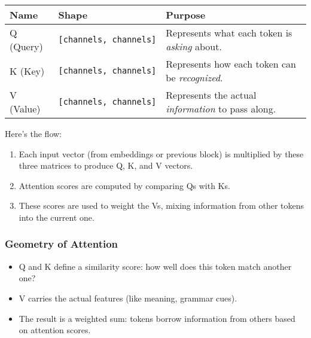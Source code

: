 \documentclass[
  letterpaper,
  DIV=11,
  numbers=noendperiod]{scrreprt}
\providecommand{\tightlist}{%
  \setlength{\itemsep}{0pt}\setlength{\parskip}{0pt}}
\begin{document}
\begin{longtable}[]{@{}
  >{\raggedright\arraybackslash}p{}
  >{\raggedright\arraybackslash}p{}
  >{\raggedright\arraybackslash}p{}@{}}
\toprule\noalign{}
\begin{minipage}[b]{\linewidth}\raggedright
Name
\end{minipage} & \begin{minipage}[b]{\linewidth}\raggedright
Shape
\end{minipage} & \begin{minipage}[b]{\linewidth}\raggedright
Purpose
\end{minipage} \\
\midrule\noalign{}
\endhead
\bottomrule\noalign{}
\endlastfoot
Q (Query) & \texttt{{[}channels,\ channels{]}} & Represents what each
token is \emph{asking} about. \\
K (Key) & \texttt{{[}channels,\ channels{]}} & Represents how each token
can be \emph{recognized}. \\
V (Value) & \texttt{{[}channels,\ channels{]}} & Represents the actual
\emph{information} to pass along. \\
\end{longtable}

Here's the flow:

\begin{enumerate}
\def\labelenumi{\arabic{enumi}.}
\tightlist
\item
  Each input vector (from embeddings or previous block) is multiplied by
  these three matrices to produce Q, K, and V vectors.
\item
  Attention scores are computed by comparing Qs with Ks.
\item
  These scores are used to weight the Vs, mixing information from other
  tokens into the current one.
\end{enumerate}

\subsubsection{Geometry of Attention}\label{geometry-of-attention}

\begin{itemize}
\tightlist
\item
  Q and K define a similarity score: how well does this token match
  another one?
\item
  V carries the actual features (like meaning, grammar cues).
\item
  The result is a weighted sum: tokens borrow information from others
  based on attention scores.
\end{itemize}
\end{document}
